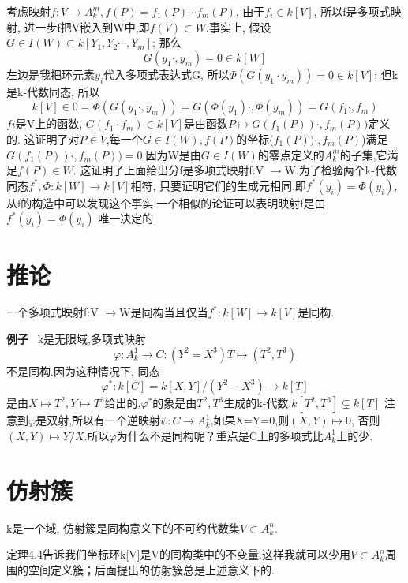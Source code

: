 \documentclass[UTF8]{book}
\begin{document}
		考虑映射$f:V \rightarrow A^{m}_{k}, f(P)=f_{1}(P)\cdots f_{m}(P)$, 由于$f_{i}\in k[V]$, 所以f是多项式映射, 进一步f把V嵌入到W中,即$f(V)\subset W$.事实上, 假设$G\in I(W)\subset k[Y_{1},Y_{2}\cdots,Y_{m}]$; 那么
		\begin{equation*}
		G(y_{1}\cdot ,y_{m})=0\in k[W]
		\end{equation*}
		左边是我把环元素$y_{i}$代入多项式表达式G, 所以$\Phi(G(y_{1}\cdot y_{m}))=0\in k[V]$; 但k是k-代数同态, 所以
		\begin{equation*}
		k[V]\in0=\Phi(G(y_{1}\cdot, y_{m}))=G(\Phi(y_{1})\cdot ,\Phi(y_{m}))=G(f_{1}\cdot ,f_{m})
		\end{equation*}
		$f{i}$是V上的函数, $G(f_{1}\cdot f_{m})\in k[V]$是由函数$P\mapsto G(f_{1}(P))\cdot ,f_{m}(P))$定义的. 这证明了对$P\in V$,每一个$G\in I(W),f(P)$的坐标($f_{1}(P))\cdot ,f_{m}(P)$)满足$G(f_{1}(P))\cdot ,f_{m}(P))=0$.因为W是由$G\in I(W)$的零点定义的$A^{m}_{k}$的子集,它满足$f(P)\in W$. 这证明了上面给出分f是多项式映射f:V $\rightarrow $W.为了检验两个k-代数同态$f^{*},\Phi:k[W]\rightarrow k[V]$相符, 只要证明它们的生成元相同,即$f^{*}(y_{i})=\Phi(y_{i})$,从f的构造中可以发现这个事实.一个相似的论证可以表明映射f是由$f^{*}(y_{i})=\Phi(y_{i})$  唯一决定的.
	\section{推论}一个多项式映射f:V $\rightarrow $W是同构当且仅当$f^{*}:k[W]\rightarrow k[V]$是同构.

		\textbf{例子} \ k是无限域,多项式映射
		\begin{equation*}
		\varphi:A^{1}_{k}\rightarrow C:(Y^{2}=X^{3})  T\mapsto (T^{2},T^{3})
		\end{equation*}
		不是同构.因为这种情况下, 同态
		\begin{equation*}
		\varphi^{*}:k[C]=k[X,Y]/(Y^{2}-X^{3})\rightarrow k[T]
		\end{equation*}
		是由$X\mapsto T^{2},Y\mapsto T^{3}$给出的.$\varphi^{*}$的象是由$T^{2},T^{3}$生成的k-代数,$k[T^{2},T^{3}]\subsetneq k[T]$
		注意到$\varphi$是双射,所以有一个逆映射$\psi :C\rightarrow A^{1}_{k}$,如果X=Y=0,则$(X,Y)\mapsto 0$, 否则$(X,Y)\mapsto Y/X$.所以$\varphi$为什么不是同构呢？重点是C上的多项式比$A^{1}_{k}$上的少.
	\section{仿射簇}
		k是一个域, 仿射簇是同构意义下的不可约代数集$V\subset A^{n}_{k}$.

		定理4.4告诉我们坐标环k[V]是V的同构类中的不变量.这样我就可以少用$V\subset A^{n}_{k}$周围的空间定义簇；后面提出的仿射簇总是上述意义下的.
\end{document}
